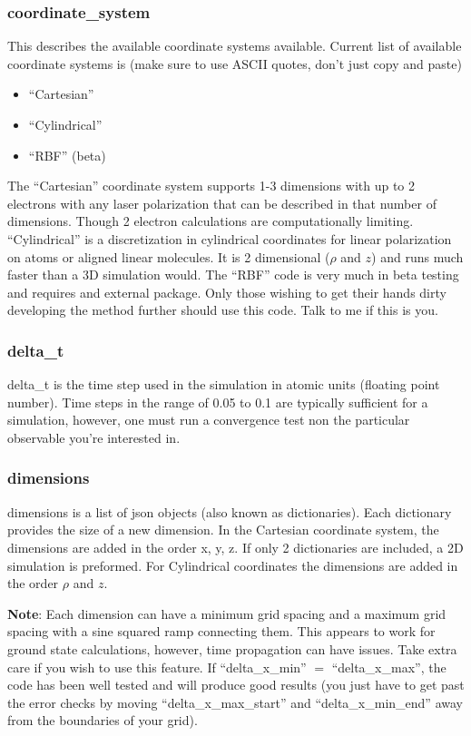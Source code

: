 \documentclass{article}
\begin{document}
\subsubsection{coordinate\_system}
This describes the available coordinate systems available. Current list of available coordinate systems is (make sure to use ASCII quotes, don't just copy and paste)
\begin{itemize}
  \item ``Cartesian''
  \item ``Cylindrical''
  \item ``RBF'' (beta)
\end{itemize}
The ``Cartesian'' coordinate system supports 1-3 dimensions with up to 2 electrons with any laser polarization that can be described in that number of dimensions. Though 2 electron calculations are computationally limiting. ``Cylindrical'' is a discretization in cylindrical coordinates for linear polarization on atoms or aligned linear molecules. It is 2 dimensional ($\rho$ and $z$) and runs much faster than a 3D simulation would. The ``RBF'' code is very much in beta testing and requires and external package. Only those wishing to get their hands dirty developing the method further should use this code. Talk to me if this is you.

\subsubsection{delta\_t}
delta\_t is the time step used in the simulation in atomic units (floating point number). Time steps in the range of 0.05 to 0.1 are typically sufficient for a simulation, however, one must run a convergence test non the particular observable you're interested in.

\subsubsection{dimensions}
\label{ssub:dimensions}
dimensions is a list of json objects (also known as dictionaries). Each dictionary provides the size of a new dimension. In the Cartesian coordinate system, the dimensions are added in the order x, y, z. If only 2 dictionaries are included, a 2D simulation is preformed. For Cylindrical coordinates the dimensions are added in the order $\rho$ and $z$.

\textbf{Note}: Each dimension can have a minimum grid spacing and a maximum grid spacing with a sine squared ramp connecting them. This appears to work for ground state calculations, however, time propagation can have issues. Take extra care if you wish to use this feature. If ``delta\_x\_min'' $=$ ``delta\_x\_max'', the code has been well tested and will produce good results (you just have to get past the error checks by moving ``delta\_x\_max\_start'' and ``delta\_x\_min\_end'' away from the boundaries of your grid).
\end{document}
